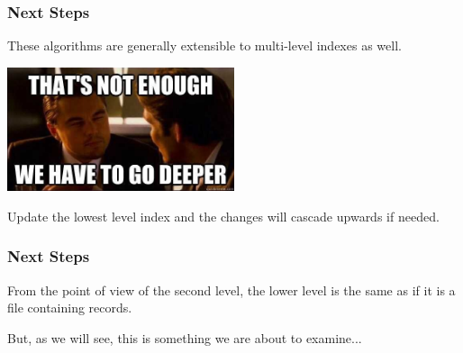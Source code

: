 \begin{frame}
\frametitle{Next Steps}

These algorithms are generally extensible to multi-level indexes as well. 

\begin{center}
	\includegraphics[width=0.5\textwidth]{images/deeper.jpg}
\end{center}

Update the lowest level index and the changes will cascade upwards if needed. 

\end{frame}

\begin{frame}
\frametitle{Next Steps}

From the point of view of the second level, the lower level is the same as if it is a file containing records. 

But, as we will see, this is something we are about to examine...


\end{frame}




